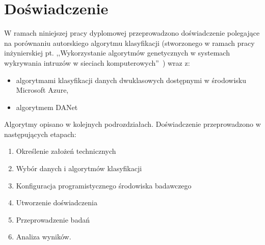 \chapter{Doświadczenie}
\label{cha:dos}
W ramach niniejszej pracy dyplomowej przeprowadzono doświadczenie polegające na porównaniu autorskiego algorytmu klasyfikacji (stworzonego w ramach pracy inżynierskiej pt. ,,Wykorzystanie algorytmów genetycznych w systemach wykrywania intruzów w sieciach komputerowych''~\cite{Blyszcz2022}) wraz z:
\begin{itemize}
    \item algorytmami klasyfikacji danych dwuklasowych dostępnymi w środowisku Microsoft Azure,
    \item algorytmem DANet~\cite{Danet, Chen2022}
\end{itemize}
Algorytmy opisano w kolejnych podrozdziałach. Doświadczenie przeprowadzono w następujących etapach:
\begin{enumerate}
    \item Określenie założeń technicznych
    \item Wybór danych i algorytmów klasyfikacji
    \item Konfiguracja programistycznego środowiska badawczego
    \item Utworzenie doświadczenia
    \item Przeprowadzenie badań
    \item Analiza wyników.
\end{enumerate}


